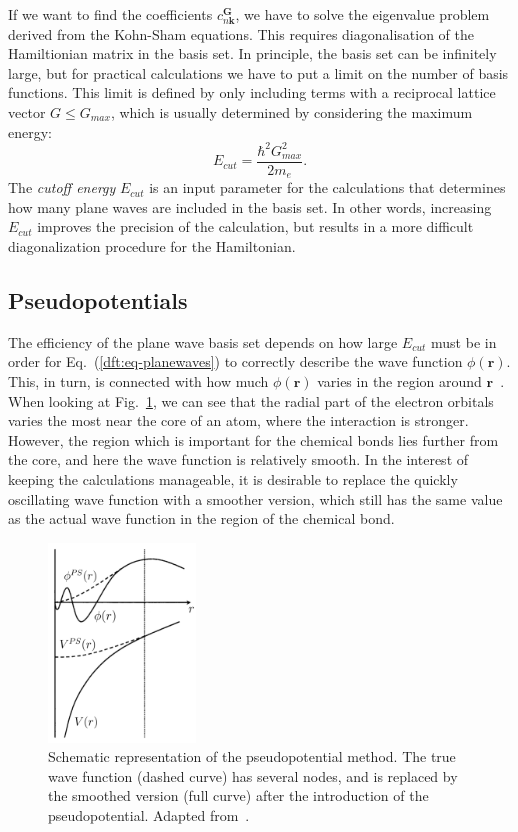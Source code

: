 \begin{refsection}
If we want to find the coefficients $c_{n\mathbf{k}}^{\mathbf{G}}$, we have to 
solve the eigenvalue problem derived from the Kohn-Sham equations. This 
requires diagonalisation of the Hamiltionian matrix in the basis set. In 
principle, the basis set can be infinitely large, but for practical 
calculations we have to put a limit on the number of basis functions. This 
limit is defined by only including terms with a reciprocal lattice vector $G 
\leq G_{max}$, which is usually determined by considering the maximum energy: 
\begin{equation} 
E_{cut} = \frac{\hbar^2 G_{max}^2}{2m_e}. 
\end{equation} 
The \textit{cutoff energy} $E_{cut}$ is an input parameter for the 
calculations that determines how many plane waves are included in the basis 
set. In other words, increasing $E_{cut}$ improves the precision of the 
calculation, but results in a more difficult diagonalization procedure for the 
Hamiltonian.  
 
\subsection{Pseudopotentials} 
 
The efficiency of the plane wave basis set depends on 
how large $E_{cut}$ must be in order for Eq.~(\ref{dft:eq-planewaves}) to correctly describe the wave function $\phi (\mathbf{r})$. 
This, in turn, is connected with how much $\phi (\mathbf{r})$ varies in the 
region around $\mathbf{r}$~\cite{Kohanoff2006}. When looking at 
Fig.~\ref{dft:fig-pseudo}, we can see that the radial part of the electron 
orbitals varies the most near the core of an atom, where the interaction is 
stronger. However, the region which is important for the chemical bonds lies 
further from the core, and here the wave function is relatively smooth. In the 
interest of keeping the calculations manageable, it is desirable to replace 
the quickly oscillating wave function with a smoother version, which still has 
the same value as the actual wave function in the region of the chemical bond. 
 
\begin{figure}[ht]  
\captionsetup{width=0.8\textwidth} 
\centering 
\includegraphics[width=0.35\textwidth]{Figures/DFT/pseudopot.png} 
\caption{\label{dft:fig-pseudo} Schematic representation of the pseudopotential 
method. The true wave function (dashed curve) has several nodes, and is 
replaced by the smoothed version (full curve) after the introduction of the 
pseudopotential. Adapted from~\cite{Singh2006}.} 
\end{figure} 
 

\end{refsection}

